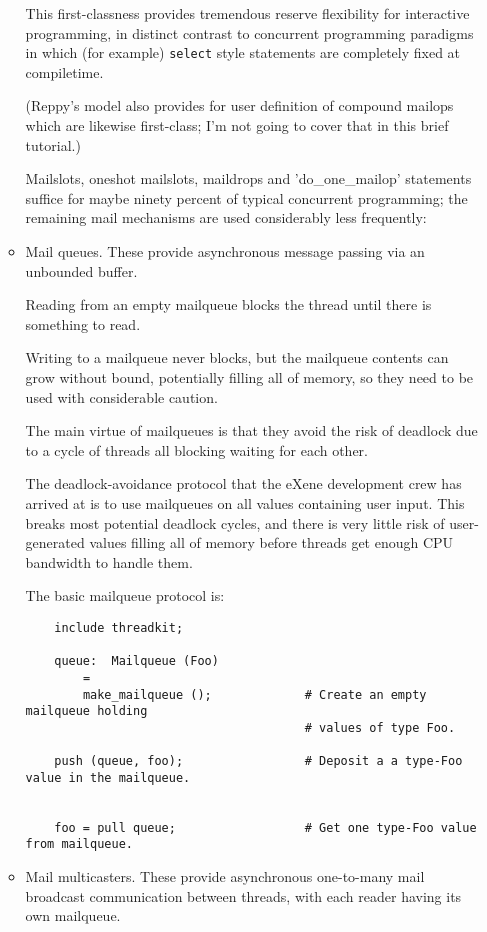 \begin{itemize}
\begin{itemize}
This first-classness provides tremendous reserve flexibility 
for interactive programming, in distinct contrast to 
concurrent programming paradigms in which (for example) 
{\tt select} style statements are completely fixed at compiletime.

(Reppy's model also provides for user definition of compound 
mailops which are likewise first-class;  I'm not going to 
cover that in this brief tutorial.) 


Mailslots, oneshot mailslots, 
maildrops and 'do\_one\_mailop' statements 
suffice for maybe ninety percent of typical 
 concurrent programming;  the 
remaining mail mechanisms are used 
considerably less frequently: 

\item 
Mail queues.  These provide asynchronous 
message passing via an unbounded buffer. 

Reading from an empty mailqueue blocks 
the thread until there is something to 
read. 

Writing to a mailqueue never blocks, 
but the mailqueue contents can grow without 
bound, potentially filling all of memory, 
so they need to be used with considerable 
caution. 

The main virtue of mailqueues is that they 
avoid the risk of deadlock due to a cycle 
of threads all blocking waiting for each 
other. 

The deadlock-avoidance protocol that the 
eXene development crew has arrived at is 
to use mailqueues on all values containing 
user input.  This breaks most potential 
deadlock cycles, and there is very little 
risk of user-generated values filling all 
of memory before threads get enough CPU 
bandwidth to handle them. 

The basic mailqueue protocol is: 

\begin{verbatim}
    include threadkit;

    queue:  Mailqueue (Foo)
        =
        make_mailqueue ();             # Create an empty mailqueue holding
                                       # values of type Foo.

    push (queue, foo);                 # Deposit a a type-Foo value in the mailqueue.


    foo = pull queue;                  # Get one type-Foo value from mailqueue.
\end{verbatim}


\item 
Mail multicasters.  These provide asynchronous 
one-to-many mail broadcast communication between 
threads, with each reader having its own mailqueue. 


\end{itemize}
\end{itemize}
